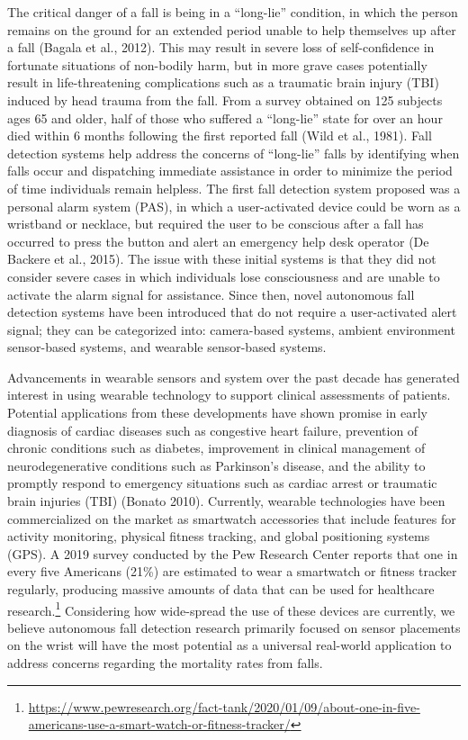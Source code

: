 \documentclass{llncs}
\begin{document}
	The critical danger of a fall is being in a ``long-lie'' condition, in which the person remains on the ground for an extended period unable to help themselves up after a fall (Bagala et al., 2012).\cite{bagala2012evaluation} This may result in severe loss of self-confidence in fortunate situations of non-bodily harm, but in more grave cases potentially result in life-threatening complications such as a traumatic brain injury (TBI) induced by head trauma from the fall. From a survey obtained on 125 subjects ages 65 and older, half of those who suffered a ``long-lie'' state for over an hour died within 6 months following the first reported fall (Wild et al., 1981).\cite{wild1981dangerous} Fall detection systems help address the concerns of ``long-lie'' falls by identifying when falls occur and dispatching immediate assistance in order to minimize the period of time individuals remain helpless. The first fall detection system proposed was a personal alarm system (PAS), in which a user-activated device could be worn as a wristband or necklace, but required the user to be conscious after a fall has occurred to press the button and alert an emergency help desk operator (De Backere et al., 2015).\cite{de2015towards} The issue with these initial systems is that they did not consider severe cases in which individuals lose consciousness and are unable to activate the alarm signal for assistance. Since then, novel autonomous fall detection systems have been introduced that do not require a user-activated alert signal; they can be categorized into: camera-based systems, ambient environment sensor-based systems, and wearable sensor-based systems. 	
	
	Advancements in wearable sensors and system over the past decade has generated interest in using wearable technology to support clinical assessments of patients. Potential applications from these developments have shown promise in early diagnosis of cardiac diseases such as congestive heart failure, prevention of chronic conditions such as diabetes, improvement in clinical management of neurodegenerative conditions such as Parkinson's disease, and the ability to promptly respond to emergency situations such as cardiac arrest or traumatic brain injuries (TBI) (Bonato 2010).\cite{bonato2010wearable} Currently, wearable technologies have been commercialized on the market as smartwatch accessories that include features for activity monitoring, physical fitness tracking, and global positioning systems (GPS). A 2019 survey conducted by the Pew Research Center reports that one in every five Americans (21\%) are estimated to wear a smartwatch or fitness tracker regularly, producing massive amounts of data that can be used for healthcare research.\footnote{\url{https://www.pewresearch.org/fact-tank/2020/01/09/about-one-in-five-americans-use-a-smart-watch-or-fitness-tracker/}} Considering how wide-spread the use of these devices are currently, we believe autonomous fall detection research primarily focused on sensor placements on the wrist will have the most potential as a universal real-world application to address concerns regarding the mortality rates from falls.	
	
\end{document}
